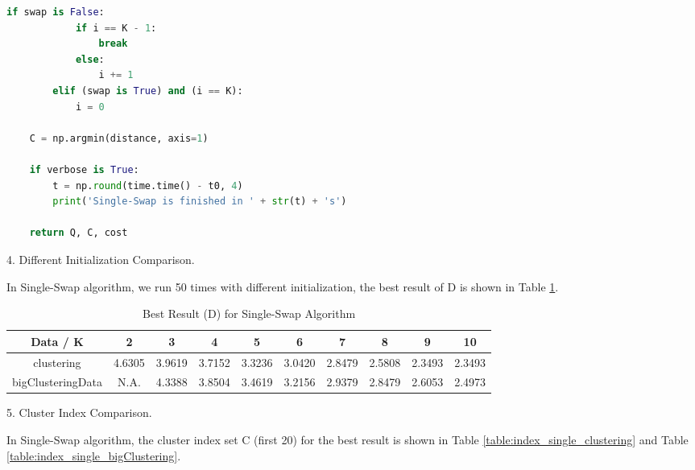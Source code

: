 \begin{description}
\begin{description}
\begin{lstlisting}[language=Python, caption=Single-Swap Algorithm Python Code]
        if swap is False:
            if i == K - 1:
                break
            else:
                i += 1
        elif (swap is True) and (i == K):
            i = 0

    C = np.argmin(distance, axis=1)

    if verbose is True:
        t = np.round(time.time() - t0, 4)
        print('Single-Swap is finished in ' + str(t) + 's')

    return Q, C, cost
\end{lstlisting}

\item{4.} Different Initialization Comparison.

In Single-Swap algorithm, we run 50 times with different initialization, the best result of D is shown in Table \ref{table:best_single}.

\begin{table}[H]
	\centering
	\caption{Best Result (D) for Single-Swap Algorithm}
	\label{table:best_single}	
	\begin{tabular}{ c | c | c | c | c | c | c | c | c | c}
		\hline \hline
		Data / K      & 2     &    3    & 4    & 5     & 6    & 7    & 8   & 9    & 10 \\[0.1cm]
		\hline
	clustering	        & 4.6305 &    3.9619 & 3.7152 & 3.3236 & 3.0420 & 2.8479 & 2.5808 & 2.3493 & 2.3493 \\[0.1cm]
bigClusteringData & N.A. &    4.3388 & 3.8504 & 3.4619 & 3.2156 & 2.9379 & 2.8479 & 2.6053 & 2.4973 \\[0.1cm]
		\hline	
	\end{tabular}
\end{table}

\item{5.} Cluster Index Comparison.

In Single-Swap algorithm, the cluster index set C (first 20) for the best result is shown in Table \ref{table:index_single_clustering} and Table \ref{table:index_single_bigClustering}.


\end{description}
\end{description}
